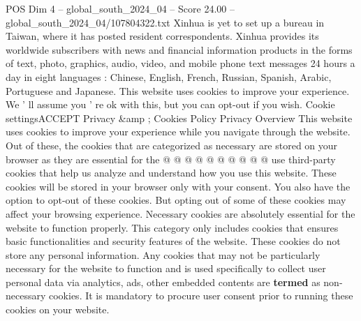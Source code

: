 \begin{textsample}{POS Dim 4 – global\_south\_2024\_04 – Score 24.00 – global\_south\_2024\_04/107804322.txt}
Xinhua is yet to set up a bureau in Taiwan, where it has posted resident correspondents.
Xinhua provides its worldwide subscribers with news and financial information products in the forms of text, photo, graphics, audio, video, and mobile phone text messages 24 hours a day in eight languages : Chinese, English, French, Russian, Spanish, Arabic, Portuguese and Japanese.
This website uses cookies to improve your experience.
We ' ll assume you ' re ok with this, but you can opt-out if you wish.
Cookie settingsACCEPT Privacy \&amp ; Cookies Policy Privacy Overview This website uses cookies to improve your experience while you navigate through the website.
Out of these, the cookies that are categorized as necessary are stored on your browser as they are essential for the @ @ @ @ @ @ @ @ @ @ use third-party cookies that help us analyze and understand how you use this website.
These cookies will be stored in your browser only with your consent.
You also have the option to opt-out of these cookies.
But opting out of some of these cookies may affect your browsing experience.
Necessary cookies are absolutely essential for the website to function properly.
This category only includes cookies that ensures basic functionalities and security features of the website.
These cookies do not store any personal information.
Any cookies that may not be particularly necessary for the website to function and is used specifically to collect user personal data via analytics, ads, other embedded contents are \textbf{termed} as non-necessary cookies.
It is mandatory to procure user consent prior to running these cookies on your website.

\end{textsample}
